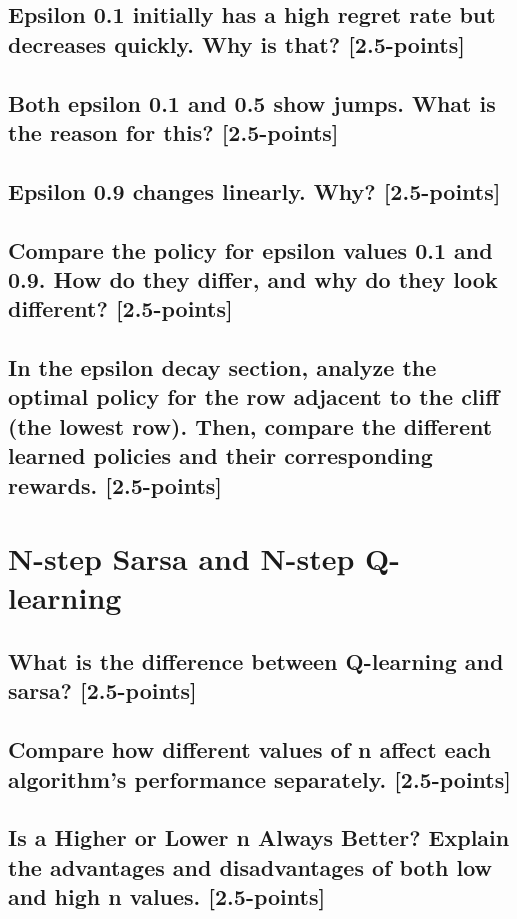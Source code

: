 \documentclass[12pt]{article}
\begin{document}
{{{\subsection{Epsilon 0.1 initially has a high regret rate but decreases quickly. Why is that? [2.5-points]}
\subsection{Both epsilon 0.1 and 0.5 show jumps. What is the reason for this? [2.5-points]}
\subsection{Epsilon 0.9 changes linearly. Why? [2.5-points]}

\subsection{Compare the policy for epsilon values 0.1 and 0.9. How do they differ, and why do they look different? [2.5-points]}

\subsection{In the epsilon decay section, analyze the optimal policy for the row adjacent to the cliff (the lowest row). Then, compare the different learned policies and their corresponding rewards. [2.5-points]}

\section{N-step Sarsa and N-step Q-learning}
\subsection{What is the difference between Q-learning and sarsa? [2.5-points]}
\subsection{Compare how different values of n affect each algorithm's performance separately. [2.5-points]}
\subsection{Is a Higher or Lower n Always Better? Explain the advantages and disadvantages of both low and high n values. [2.5-points]}

}}

}
\end{document}
